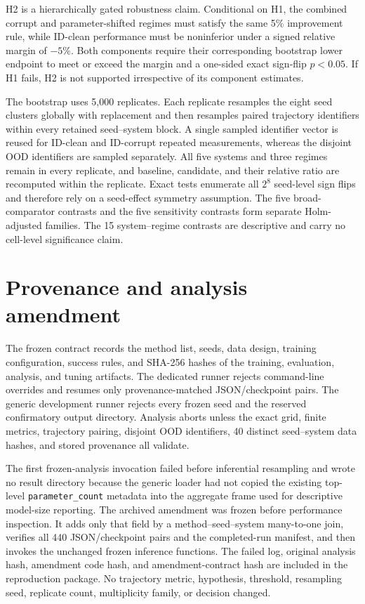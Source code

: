 H2 is a hierarchically gated robustness claim. Conditional on H1, the combined corrupt and parameter-shifted regimes must satisfy the same 5\% improvement rule, while ID-clean performance must be noninferior under a signed relative margin of $-5\%$. Both components require their corresponding bootstrap lower endpoint to meet or exceed the margin and a one-sided exact sign-flip $p<0.05$. If H1 fails, H2 is not supported irrespective of its component estimates.

The bootstrap uses 5,000 replicates. Each replicate resamples the eight seed clusters globally with replacement and then resamples paired trajectory identifiers within every retained seed--system block. A single sampled identifier vector is reused for ID-clean and ID-corrupt repeated measurements, whereas the disjoint OOD identifiers are sampled separately. All five systems and three regimes remain in every replicate, and baseline, candidate, and their relative ratio are recomputed within the replicate. Exact tests enumerate all $2^8$ seed-level sign flips and therefore rely on a seed-effect symmetry assumption. The five broad-comparator contrasts and the five sensitivity contrasts form separate Holm-adjusted families. The 15 system--regime contrasts are descriptive and carry no cell-level significance claim.

\section{Provenance and analysis amendment}

The frozen contract records the method list, seeds, data design, training configuration, success rules, and SHA-256 hashes of the training, evaluation, analysis, and tuning artifacts. The dedicated runner rejects command-line overrides and resumes only provenance-matched JSON/checkpoint pairs. The generic development runner rejects every frozen seed and the reserved confirmatory output directory. Analysis aborts unless the exact grid, finite metrics, trajectory pairing, disjoint OOD identifiers, 40 distinct seed--system data hashes, and stored provenance all validate.

The first frozen-analysis invocation failed before inferential resampling and wrote no result directory because the generic loader had not copied the existing top-level \texttt{parameter\_count} metadata into the aggregate frame used for descriptive model-size reporting. The archived amendment was frozen before performance inspection. It adds only that field by a method--seed--system many-to-one join, verifies all 440 JSON/checkpoint pairs and the completed-run manifest, and then invokes the unchanged frozen inference functions. The failed log, original analysis hash, amendment code hash, and amendment-contract hash are included in the reproduction package. No trajectory metric, hypothesis, threshold, resampling seed, replicate count, multiplicity family, or decision changed.

